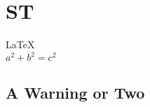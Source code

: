 \documentclass{article}
\begin{document}
               
 
 
\section{ST}          
\LaTeX \,\\ 
 $a^2+b^2=c^2$

\subsection{A Warning or Two}  

\end{document}
